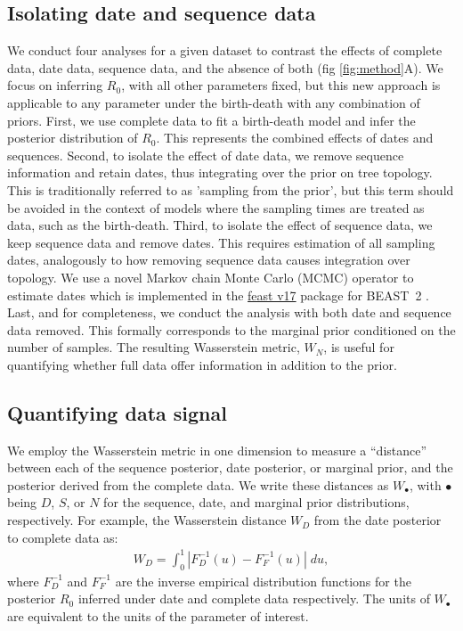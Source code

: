 \documentclass{article}
\begin{document}
\subsection*{Isolating date and sequence data}
We conduct four analyses for a given dataset to contrast the effects of complete data, date data, sequence data, and the absence of both (fig \ref{fig:method}A). We focus on inferring $R_{0}$, with all other parameters fixed, but this new approach is applicable to any parameter under the birth-death with any combination of priors. First, we use complete data to fit a birth-death model and infer the posterior distribution of $R_{0}$. This represents the combined effects of dates and sequences. Second, to isolate the effect of date data, we remove sequence information and retain dates, thus integrating over the prior on tree topology. This is traditionally referred to as 'sampling from the prior', but this term should be avoided in the context of models where the sampling times are treated as data, such as the birth-death. Third, to isolate the effect of sequence data, we keep sequence data and remove dates. This requires estimation of all sampling dates, analogously to how removing sequence data causes integration over topology. We use a novel Markov chain Monte Carlo (MCMC) operator to estimate dates which is implemented in the \href{https://github.com/tgvaughan/feast}{feast v17} package for BEAST~2 \citep{bouckaert_beast_2019}. Last, and for completeness, we conduct the analysis with both date and sequence data removed. This formally corresponds to the marginal prior conditioned on the number of samples. The resulting Wasserstein metric, $W_N$, is useful for quantifying whether full data offer information in addition to the prior.
\subsection*{Quantifying data signal}
We  employ the Wasserstein metric in one dimension to measure a ``distance'' between each of the sequence posterior, date posterior, or marginal prior, and the posterior derived from the complete data. We write these distances as $W_{\bullet}$, with $\bullet$ being $D$, $S$, or $N$ for the sequence, date, and marginal prior distributions, respectively. For example, the Wasserstein distance $W_D$ from the date posterior to complete data as:
\begin{align*}
W_D = \int_0^1 |F_{D}^{-1}(u)-F_{F}^{-1}(u)| \; du, 
\end{align*}
where $F_{D}^{-1}$ and $F_{F}^{-1}$ are the inverse empirical distribution functions for the posterior $R_{0}$ inferred under date and complete data respectively. The units of $W_{\bullet}$ are equivalent to the units of the parameter of interest.
\end{document}
